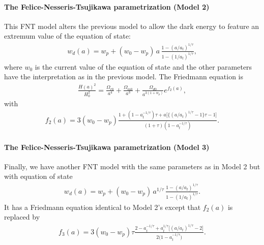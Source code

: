 \documentclass[letterpaper,12pt,english]{sphinxhowto}
\begin{document}
\paragraph{The Felice-Nesseris-Tsujikawa parametrization (Model 2)}
\label{\detokenize{themodels:the-felice-nesseris-tsujikawa-parametrization-model-2}}
This FNT model  alters the previous model to allow the dark energy
to feature an extremum value of the equation of state: \sphinxfootnotemark[6]
\begin{equation*}
\begin{split}w_d(a) = w_p + (w_0 - w_p) \, a \, \frac{1 - (a/a_t)^{1/\tau}}{1 - (1/a_t)^{1/\tau}},\end{split}
\end{equation*}
where \(w_0\) is the current value of the equation of state and the other
parameters have the interpretation as in the previous model.
The Friedmann equation is
\begin{equation*}
\begin{split}\frac{H(a)^2}{H_0^2} = \frac{\Omega_{r0}}{a^4} + \frac{\Omega_{m0}}{a^3} + \frac{\Omega_{d0}}{a^{3(1+w_p)}} e^{f_2(a)},\end{split}
\end{equation*}
with
\begin{equation*}
\begin{split}f_2(a) = 3 (w_0 - w_p) \frac{1+ (1- a_t^{-1/\tau})\tau + a \bigl[\bigl\lbrace (a/a_t)^{1/\tau} - 1 \bigr\rbrace \tau - 1 \bigr]}{(1+\tau)(1 - a_t^{-1/\tau})}.\end{split}
\end{equation*}

\paragraph{The Felice-Nesseris-Tsujikawa parametrization (Model 3)}
\label{\detokenize{themodels:the-felice-nesseris-tsujikawa-parametrization-model-3}}
Finally, we have another FNT model  with the same parameters as in Model 2 but with equation of state \sphinxfootnotemark[6]
\begin{equation*}
\begin{split}w_d(a) = w_p + (w_0 - w_p) \, a^{1/\tau} \, \frac{1 - (a/a_t)^{1/\tau}}{1 - (1/a_t)^{1/\tau}}.\end{split}
\end{equation*}
It has a Friedmann equation identical to Model 2’s except that \(f_2(a)\) is replaced by
\begin{equation*}
\begin{split}f_3(a) = 3(w_0 - w_p) \tau \frac{2 - a_t^{-1/\tau} + a_t^{1/\tau} \bigl[(a/a_t)^{1/\tau} - 2 \bigr]}{2 \bigl(1 - a_t^{-1/\tau}\bigr)}.\end{split}
\end{equation*}
\end{document}
